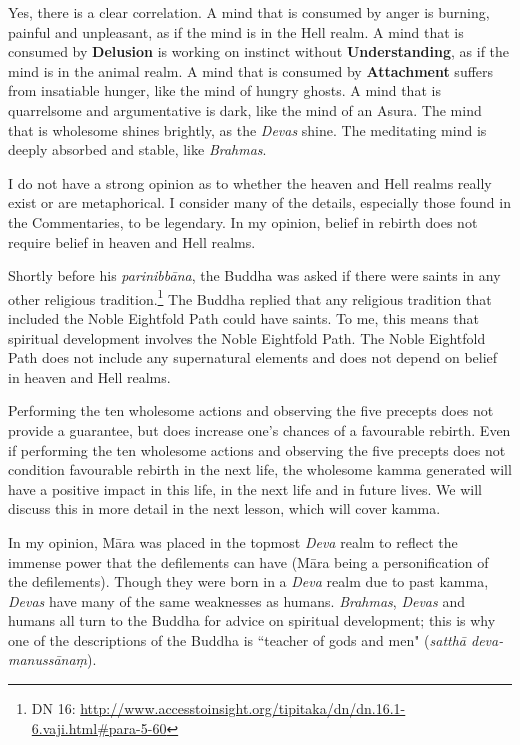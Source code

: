 Yes, there is a clear correlation. A mind that is consumed by anger is burning, painful and unpleasant, as if the mind is in the Hell realm. A mind that is consumed by \textbf{Delusion} is working on instinct without \textbf{Understanding}, as if the mind is in the animal realm. A mind that is consumed by \textbf{Attachment} suffers from insatiable hunger, like the mind of hungry ghosts. A mind that is quarrelsome and argumentative is dark, like the mind of an Asura. The mind that is wholesome shines brightly, as the \textit{Devas} shine. The meditating mind is deeply absorbed and stable, like \textit{Brahmas}.


I do not have a strong opinion as to whether the heaven and Hell realms really exist or are metaphorical. I consider many of the details, especially those found in the Commentaries, to be legendary. In my opinion, belief in rebirth does not require belief in heaven and Hell realms.

Shortly before his \textit{parinibbāna}, the Buddha was asked if there were saints in any other religious tradition.\footnote{DN 16: \url{http://www.accesstoinsight.org/tipitaka/dn/dn.16.1-6.vaji.html\#para-5-60}} The Buddha replied that any religious tradition that included the Noble Eightfold Path could have saints. To me, this means that spiritual development involves the Noble Eightfold Path. The Noble Eightfold Path does not include any supernatural elements and does not depend on belief in heaven and Hell realms.


Performing the ten wholesome actions and observing the five precepts does not provide a guarantee, but does increase one’s chances of a favourable rebirth. Even if performing the ten wholesome actions and observing the five precepts does not condition favourable rebirth in the next life, the wholesome kamma generated will have a positive impact in this life, in the next life and in future lives. We will discuss this in more detail in the next lesson, which will cover kamma.


In my opinion, Māra was placed in the topmost \textit{Deva} realm to reflect the immense power that the defilements can have (Māra being a personification of the defilements). Though they were born in a \textit{Deva} realm due to past kamma, \textit{Devas} have many of the same weaknesses as humans. \textit{Brahmas}, \textit{Devas} and humans all turn to the Buddha for advice on spiritual development; this is why one of the descriptions of the Buddha is ``teacher of gods and men" (\textit{satthā deva-manussānaṃ}). 

